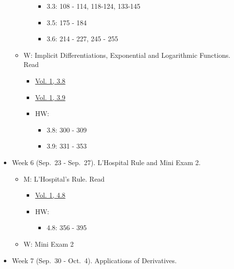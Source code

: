 \documentclass[
]{article}
\providecommand{\tightlist}{%
  \setlength{\itemsep}{0pt}\setlength{\parskip}{0pt}}
\begin{document}
\begin{itemize}
\begin{itemize}
\begin{itemize}
      \begin{itemize}
      \tightlist
      \item
        3.3: 108 - 114, 118-124, 133-145
      \item
        3.5: 175 - 184
      \item
        3.6: 214 - 227, 245 - 255
      \end{itemize}
    \end{itemize}
  \item
    W: Implicit Differentiations, Exponential and Logarithmic Functions. Read

    \begin{itemize}
    \tightlist
    \item
      \href{https://openstax.org/books/calculus-volume-1/pages/3-8-implicit-differentiation}{Vol. 1, 3.8}
    \item
      \href{https://openstax.org/books/calculus-volume-1/pages/3-9-derivatives-of-exponential-and-logarithmic-functions}{Vol. 1, 3.9}
    \item
      HW:

      \begin{itemize}
      \tightlist
      \item
        3.8: 300 - 309
      \item
        3.9: 331 - 353
      \end{itemize}
    \end{itemize}
  \end{itemize}
\item
  Week 6 (Sep.~23 - Sep.~27). L'Hospital Rule and Mini Exam 2.

  \begin{itemize}
  \tightlist
  \item
    M: L'Hospital's Rule. Read

    \begin{itemize}
    \tightlist
    \item
      \href{https://openstax.org/books/calculus-volume-1/pages/4-8-lhopitals-rule}{Vol. 1, 4.8}
    \item
      HW:

      \begin{itemize}
      \tightlist
      \item
        4.8: 356 - 395
      \end{itemize}
    \end{itemize}
  \item
    W: Mini Exam 2
  \end{itemize}
\item
  Week 7 (Sep.~30 - Oct.~4). Applications of Derivatives.


\end{itemize}
\end{document}
